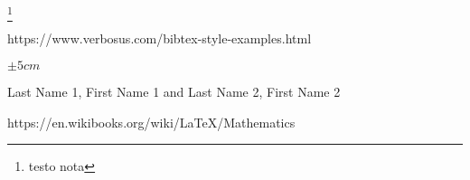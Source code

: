 
\usepackage{hyperref}


\footnote{testo nota}


https://www.verbosus.com/bibtex-style-examples.html


\textsuperscript{\textregistered}


\usepackage{listing}




\usepackage{siunitx}
\usepackage{textcomp}
\textdegree


$\pm 5 cm$


\usepackage{url}
\def\UrlBreaks{\do\/\do-}




{Last Name 1, First Name 1 and  Last Name 2, First Name 2}


https://en.wikibooks.org/wiki/LaTeX/Mathematics
